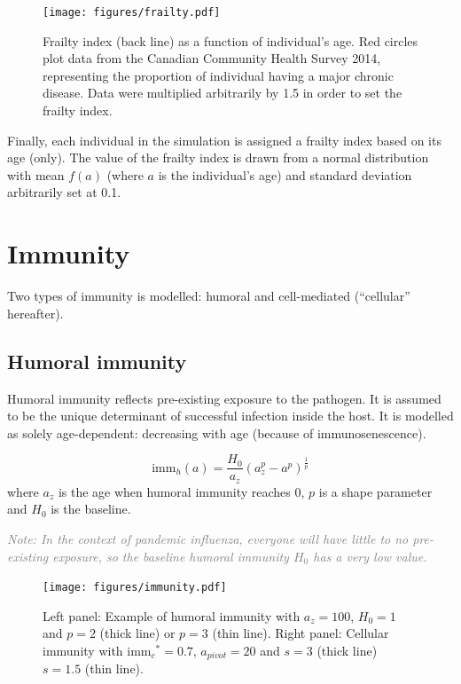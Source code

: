 \documentclass[11pt, onecolumn]{article}
\newcommand{\note}[1]{\textit{\textcolor{Grey}{Note: #1}}}
\newcommand{\immh}{\ensuremath{\text{imm}_h}}
\newcommand{\immc}{\ensuremath{\text{imm}_c}}
\begin{document}
\begin{figure}[!ht]
\centering
    \texttt{[image: figures/frailty.pdf]}
\caption{Frailty index (back line) as a function of individual's age. Red circles plot data from the Canadian Community Health Survey 2014, representing the proportion of individual having a major chronic disease. Data were multiplied arbitrarily by 1.5 in order to set the frailty index.}
\label{fig:frailty}
\end{figure}

Finally, each individual in the simulation is assigned a frailty index based on its age (only). The value of the frailty index is drawn from a normal distribution with mean $f(a)$ (where $a$ is the individual's age) and standard deviation arbitrarily set at 0.1.


\section{Immunity}

Two types of immunity is modelled: humoral and cell-mediated (``cellular'' hereafter). 

\subsection{Humoral immunity}	
Humoral immunity reflects pre-existing exposure to the pathogen. It is assumed to be the unique determinant of successful infection inside the host. It is modelled as solely age-dependent: decreasing with age (because of immunosenescence).

\begin{equation}
\immh (a) = \frac{H_0 }{a_z}(a_z^p - a^p) ^\frac{1}{p}
\end{equation}
where $a_z$ is the age when humoral immunity reaches 0, $p$ is a shape parameter  and $H_0$ is the baseline.

\note{In the context of pandemic influenza, everyone will have little to no pre-existing exposure, so the baseline humoral immunity $H_0$ has a very low value.}

\begin{figure}[!ht]
\centering
    \texttt{[image: figures/immunity.pdf]}
\caption{Left panel: Example of humoral immunity with $a_z=100$, $H_0=1$ and $p=2$ (thick line) or $p=3$ (thin line). Right panel: Cellular immunity with $\immc^* = 0.7$,  $a_{pivot}=20$ and $s=3$ (thick line) $s=1.5$ (thin line).}
\label{fig:immunity}
\end{figure}
\end{document}
